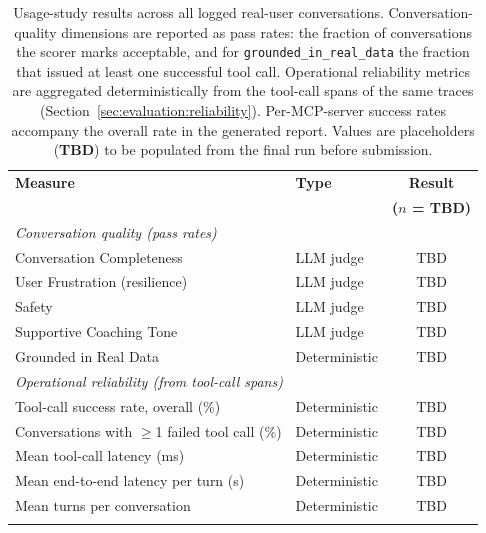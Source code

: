 \begin{table}[ht]
\begin{center}
\begin{minipage}{\textwidth}
\caption[Usage-study results (placeholder)]{Usage-study results across all logged real-user conversations. Conversation-quality dimensions are reported as pass rates: the fraction of conversations the scorer marks acceptable, and for \texttt{grounded\_in\_real\_data} the fraction that issued at least one successful tool call. Operational reliability metrics are aggregated deterministically from the tool-call spans of the same traces (Section~\ref{sec:evaluation:reliability}). Per-MCP-server success rates accompany the overall rate in the generated report. Values are placeholders (\textbf{TBD}) to be populated from the final run before submission.}\label{tab:results}
\begin{tabularx}{\textwidth}{Xlc}
\toprule
\textbf{Measure} & \textbf{Type} & \textbf{Result} \\
 & & \textbf{($n$ = TBD)} \\
\midrule
\multicolumn{3}{l}{\textit{Conversation quality (pass rates)}} \\
\addlinespace
Conversation Completeness & LLM judge & TBD \\
User Frustration (resilience) & LLM judge & TBD \\
Safety & LLM judge & TBD \\
Supportive Coaching Tone & LLM judge & TBD \\
Grounded in Real Data & Deterministic & TBD \\
\midrule
\multicolumn{3}{l}{\textit{Operational reliability (from tool-call spans)}} \\
\addlinespace
Tool-call success rate, overall (\%) & Deterministic & TBD \\
Conversations with $\geq$1 failed tool call (\%) & Deterministic & TBD \\
Mean tool-call latency (ms) & Deterministic & TBD \\
Mean end-to-end latency per turn (s) & Deterministic & TBD \\
Mean turns per conversation & Deterministic & TBD \\
\botrule
\end{tabularx}
\end{minipage}
\end{center}
\end{table}
